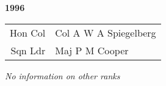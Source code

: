 \begin{center}
  \Huge
  \textbf{1996}
\end{center}

\begin{center}
  \small
  \begin{tabular}{rl}
    Hon Col & Col A W A Spiegelberg \\
    Sqn Ldr & Maj P M Cooper \\
  \end{tabular}
\end{center}

\begin{center}
  \textit{No information on other ranks}
\end{center}

\vspace{50mm}

\pagebreak
